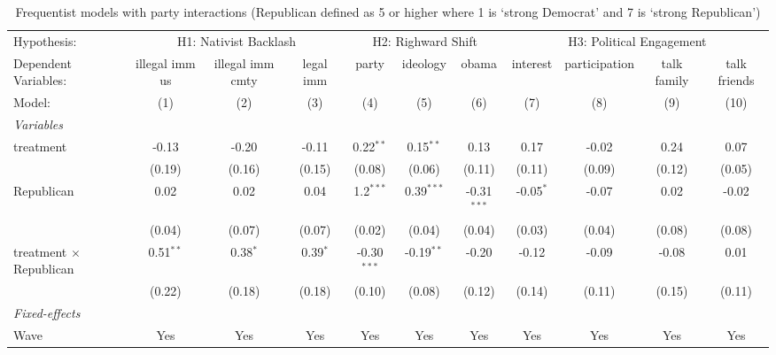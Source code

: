 
\begin{table}[htbp]
   \caption{\label{tab:rep_4} Frequentist models with party interactions (Republican defined as 5 or higher where 1 is `strong Democrat' and 7 is `strong Republican')}
   \centering
   \begin{tabular}{lcccccccccc}
      \tabularnewline \midrule \midrule
      Hypothesis: & \multicolumn{3}{c}{H1: Nativist Backlash} & \multicolumn{3}{c}{H2: Righward Shift} & \multicolumn{4}{c}{H3: Political Engagement} \\ 
      Dependent Variables:           & illegal imm us & illegal imm cmty & legal imm  & party         & ideology     & obama         & interest    & participation & talk family & talk friends\\  
      Model:                         & (1)            & (2)              & (3)        & (4)           & (5)          & (6)           & (7)         & (8)           & (9)         & (10)\\  
      \midrule
      \emph{Variables}\\
      treatment                      & -0.13          & -0.20            & -0.11      & 0.22$^{**}$   & 0.15$^{**}$  & 0.13          & 0.17        & -0.02         & 0.24        & 0.07\\   
                                     & (0.19)         & (0.16)           & (0.15)     & (0.08)        & (0.06)       & (0.11)        & (0.11)      & (0.09)        & (0.12)      & (0.05)\\   
      Republican                     & 0.02           & 0.02             & 0.04       & 1.2$^{***}$   & 0.39$^{***}$ & -0.31$^{***}$ & -0.05$^{*}$ & -0.07         & 0.02        & -0.02\\   
                                     & (0.04)         & (0.07)           & (0.07)     & (0.02)        & (0.04)       & (0.04)        & (0.03)      & (0.04)        & (0.08)      & (0.08)\\   
      treatment $\times$ Republican  & 0.51$^{**}$    & 0.38$^{*}$       & 0.39$^{*}$ & -0.30$^{***}$ & -0.19$^{**}$ & -0.20         & -0.12       & -0.09         & -0.08       & 0.01\\   
                                     & (0.22)         & (0.18)           & (0.18)     & (0.10)        & (0.08)       & (0.12)        & (0.14)      & (0.11)        & (0.15)      & (0.11)\\   
      \midrule
      \emph{Fixed-effects}\\
      Wave                           & Yes            & Yes              & Yes        & Yes           & Yes          & Yes           & Yes         & Yes           & Yes         & Yes\\  

\end{tabular}
\end{table}

